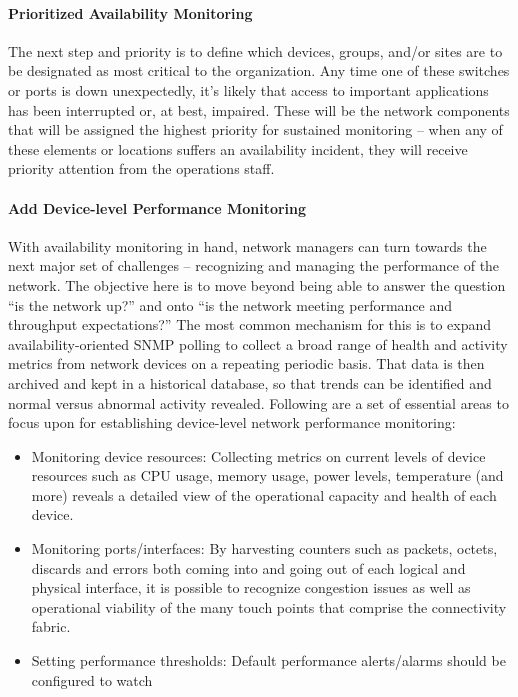 \documentclass[8pt]{extarticle}
\begin{document}
\begin{multicols}{3}
\paragraph{Prioritized Availability Monitoring}
The next step and priority is to define which devices, groups, and/or sites are to be designated as most
critical to the organization. Any time one of these switches or ports is down unexpectedly, it’s likely
that access to important applications has been interrupted or, at best, impaired. These will be the
network components that will be assigned the highest priority for sustained monitoring – when any of
these elements or locations suffers an availability incident, they will receive priority attention from the
operations staff.

\paragraph{Add Device-level Performance Monitoring}
With availability monitoring in hand, network managers can turn towards the next major set of
challenges – recognizing and managing the performance of the network. The objective here is to move
beyond being able to answer the question “is the network up?” and onto “is the network meeting
performance and throughput expectations?” The most common mechanism for this is to expand
availability-oriented SNMP polling to collect a broad range of health and activity metrics from network
devices on a repeating periodic basis. That data is then archived and kept in a historical database, so that
trends can be identified and normal versus abnormal activity revealed.
Following are a set of essential areas to focus upon for establishing device-level network performance monitoring:
\begin{itemize}
    \item Monitoring device resources: Collecting metrics on current levels of device resources such as
    CPU usage, memory usage, power levels, temperature (and more) reveals a detailed view of the
    operational capacity and health of each device.
    \item Monitoring ports/interfaces: By harvesting counters such as packets, octets, discards and errors
    both coming into and going out of each logical and physical interface, it is possible to recognize
    congestion issues as well as operational viability of the many touch points that comprise the
    connectivity fabric.
    \item Setting performance thresholds: Default performance alerts/alarms should be configured to watch

\end{itemize}
\end{multicols}
\end{document}
